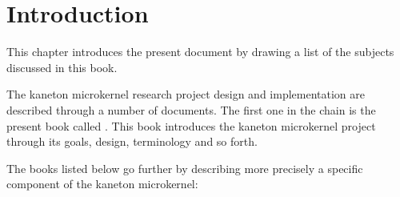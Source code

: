 %
%
%
%
%
%

%
%

\chapter{Introduction}

This chapter introduces the present document by drawing a list of the subjects
discussed in this book.

\newpage

%
%

The kaneton microkernel research project design and implementation are
described through a number of documents. The first one in the chain is
the present book called . This book introduces
the kaneton microkernel project through its goals, design, terminology and so
forth.

The books listed below go further by describing more precisely a specific
component of the kaneton microkernel:

